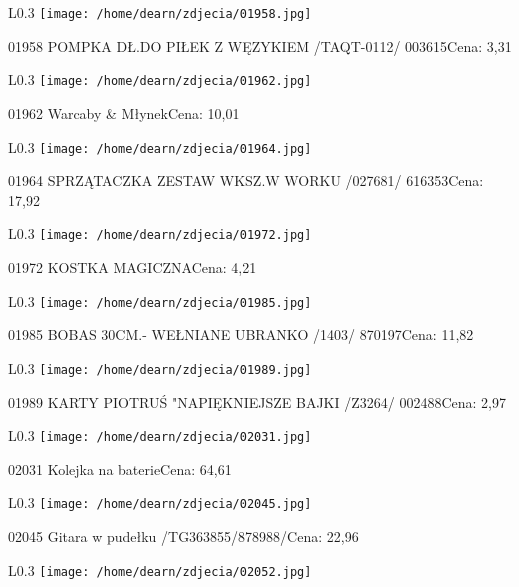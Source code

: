 \begin{wrapfigure}{L}{0.3\textwidth}
\texttt{[image: /home/dearn/zdjecia/01958.jpg]}
\end{wrapfigure}
01958 POMPKA DŁ.DO PIŁEK Z WĘZYKIEM /TAQT-0112/       003615Cena: 3,31\newline
\begin{wrapfigure}{L}{0.3\textwidth}
\texttt{[image: /home/dearn/zdjecia/01962.jpg]}
\end{wrapfigure}
01962 Warcaby & MłynekCena: 10,01\newline
\begin{wrapfigure}{L}{0.3\textwidth}
\texttt{[image: /home/dearn/zdjecia/01964.jpg]}
\end{wrapfigure}
01964 SPRZĄTACZKA ZESTAW WKSZ.W WORKU /027681/        616353Cena: 17,92\newline
\begin{wrapfigure}{L}{0.3\textwidth}
\texttt{[image: /home/dearn/zdjecia/01972.jpg]}
\end{wrapfigure}
01972 KOSTKA MAGICZNACena: 4,21\newline
\begin{wrapfigure}{L}{0.3\textwidth}
\texttt{[image: /home/dearn/zdjecia/01985.jpg]}
\end{wrapfigure}
01985 BOBAS 30CM.- WEŁNIANE UBRANKO /1403/            870197Cena: 11,82\newline
\begin{wrapfigure}{L}{0.3\textwidth}
\texttt{[image: /home/dearn/zdjecia/01989.jpg]}
\end{wrapfigure}
01989 KARTY PIOTRUŚ "NAPIĘKNIEJSZE BAJKI /Z3264/      002488Cena: 2,97\newline
\begin{wrapfigure}{L}{0.3\textwidth}
\texttt{[image: /home/dearn/zdjecia/02031.jpg]}
\end{wrapfigure}
02031 Kolejka na baterieCena: 64,61\newline
\begin{wrapfigure}{L}{0.3\textwidth}
\texttt{[image: /home/dearn/zdjecia/02045.jpg]}
\end{wrapfigure}
02045 Gitara w pudełku /TG363855/878988/Cena: 22,96\newline
\begin{wrapfigure}{L}{0.3\textwidth}
\texttt{[image: /home/dearn/zdjecia/02052.jpg]}
\end{wrapfigure}
